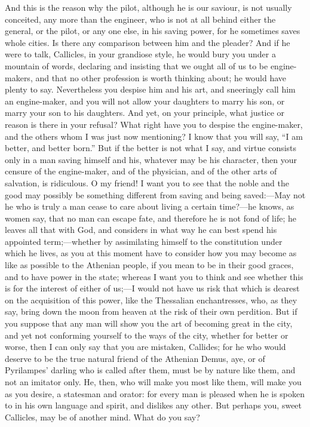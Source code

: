 \documentclass[11pt,letter]{article}
\begin{document}
\par  And this is the reason why the pilot, although he is our saviour, is not usually conceited, any more than the engineer, who is not at all behind either the general, or the pilot, or any one else, in his saving power, for he sometimes saves whole cities. Is there any comparison between him and the pleader? And if he were to talk, Callicles, in your grandiose style, he would bury you under a mountain of words, declaring and insisting that we ought all of us to be engine-makers, and that no other profession is worth thinking about; he would have plenty to say. Nevertheless you despise him and his art, and sneeringly call him an engine-maker, and you will not allow your daughters to marry his son, or marry your son to his daughters. And yet, on your principle, what justice or reason is there in your refusal? What right have you to despise the engine-maker, and the others whom I was just now mentioning? I know that you will say, “I am better, and better born.” But if the better is not what I say, and virtue consists only in a man saving himself and his, whatever may be his character, then your censure of the engine-maker, and of the physician, and of the other arts of salvation, is ridiculous. O my friend! I want you to see that the noble and the good may possibly be something different from saving and being saved:—May not he who is truly a man cease to care about living a certain time?—he knows, as women say, that no man can escape fate, and therefore he is not fond of life; he leaves all that with God, and considers in what way he can best spend his appointed term;—whether by assimilating himself to the constitution under which he lives, as you at this moment have to consider how you may become as like as possible to the Athenian people, if you mean to be in their good graces, and to have power in the state; whereas I want you to think and see whether this is for the interest of either of us;—I would not have us risk that which is dearest on the acquisition of this power, like the Thessalian enchantresses, who, as they say, bring down the moon from heaven at the risk of their own perdition. But if you suppose that any man will show you the art of becoming great in the city, and yet not conforming yourself to the ways of the city, whether for better or worse, then I can only say that you are mistaken, Callides; for he who would deserve to be the true natural friend of the Athenian Demus, aye, or of Pyrilampes’ darling who is called after them, must be by nature like them, and not an imitator only. He, then, who will make you most like them, will make you as you desire, a statesman and orator: for every man is pleased when he is spoken to in his own language and spirit, and dislikes any other. But perhaps you, sweet Callicles, may be of another mind. What do you say?
\end{document}
